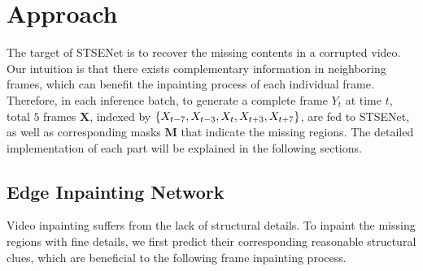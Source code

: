 \section{Approach}
\label{sec:approach}

The target of STSENet is to recover the missing contents in a corrupted video.
%
Our intuition is that there exists complementary information in neighboring frames, which can benefit the inpainting process of each individual frame.
Therefore, in each inference batch, to generate a complete frame \(Y_t\) at time $t$, total $5$ frames $\boldsymbol{X}$, indexed by $\{X_{t-7},X_{t-3},X_{t},X_{t+3},X_{t+7}\}$, are fed to STSENet, as well as corresponding masks $\boldsymbol{M}$ that indicate the missing regions.
%
The detailed implementation of each part will be explained in the following sections.

 



\subsection{Edge Inpainting Network}
\label{sec:edgenet}

Video inpainting suffers from the lack of structural details.
To inpaint the missing regions with fine details, we first predict their corresponding reasonable structural clues, which are beneficial to the following frame inpainting process.
%

